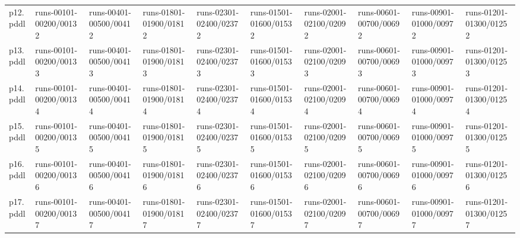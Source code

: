 \documentclass{article}
\begin{document}
\begin{tabular}{@{}lrrrrrrrrr@{}}
p12.pddl & \multicolumn{1}{|l|}{runs-00101-00200/00132} & \multicolumn{1}{|l|}{runs-00401-00500/00412} & \multicolumn{1}{|l|}{runs-01801-01900/01812} & \multicolumn{1}{|l|}{runs-02301-02400/02372} & \multicolumn{1}{|l|}{runs-01501-01600/01532} & \multicolumn{1}{|l|}{runs-02001-02100/02092} & \multicolumn{1}{|l|}{runs-00601-00700/00692} & \multicolumn{1}{|l|}{runs-00901-01000/00972} & \multicolumn{1}{|l|}{runs-01201-01300/01252} \\
p13.pddl & \multicolumn{1}{|l|}{runs-00101-00200/00133} & \multicolumn{1}{|l|}{runs-00401-00500/00413} & \multicolumn{1}{|l|}{runs-01801-01900/01813} & \multicolumn{1}{|l|}{runs-02301-02400/02373} & \multicolumn{1}{|l|}{runs-01501-01600/01533} & \multicolumn{1}{|l|}{runs-02001-02100/02093} & \multicolumn{1}{|l|}{runs-00601-00700/00693} & \multicolumn{1}{|l|}{runs-00901-01000/00973} & \multicolumn{1}{|l|}{runs-01201-01300/01253} \\
p14.pddl & \multicolumn{1}{|l|}{runs-00101-00200/00134} & \multicolumn{1}{|l|}{runs-00401-00500/00414} & \multicolumn{1}{|l|}{runs-01801-01900/01814} & \multicolumn{1}{|l|}{runs-02301-02400/02374} & \multicolumn{1}{|l|}{runs-01501-01600/01534} & \multicolumn{1}{|l|}{runs-02001-02100/02094} & \multicolumn{1}{|l|}{runs-00601-00700/00694} & \multicolumn{1}{|l|}{runs-00901-01000/00974} & \multicolumn{1}{|l|}{runs-01201-01300/01254} \\
p15.pddl & \multicolumn{1}{|l|}{runs-00101-00200/00135} & \multicolumn{1}{|l|}{runs-00401-00500/00415} & \multicolumn{1}{|l|}{runs-01801-01900/01815} & \multicolumn{1}{|l|}{runs-02301-02400/02375} & \multicolumn{1}{|l|}{runs-01501-01600/01535} & \multicolumn{1}{|l|}{runs-02001-02100/02095} & \multicolumn{1}{|l|}{runs-00601-00700/00695} & \multicolumn{1}{|l|}{runs-00901-01000/00975} & \multicolumn{1}{|l|}{runs-01201-01300/01255} \\
p16.pddl & \multicolumn{1}{|l|}{runs-00101-00200/00136} & \multicolumn{1}{|l|}{runs-00401-00500/00416} & \multicolumn{1}{|l|}{runs-01801-01900/01816} & \multicolumn{1}{|l|}{runs-02301-02400/02376} & \multicolumn{1}{|l|}{runs-01501-01600/01536} & \multicolumn{1}{|l|}{runs-02001-02100/02096} & \multicolumn{1}{|l|}{runs-00601-00700/00696} & \multicolumn{1}{|l|}{runs-00901-01000/00976} & \multicolumn{1}{|l|}{runs-01201-01300/01256} \\
p17.pddl & \multicolumn{1}{|l|}{runs-00101-00200/00137} & \multicolumn{1}{|l|}{runs-00401-00500/00417} & \multicolumn{1}{|l|}{runs-01801-01900/01817} & \multicolumn{1}{|l|}{runs-02301-02400/02377} & \multicolumn{1}{|l|}{runs-01501-01600/01537} & \multicolumn{1}{|l|}{runs-02001-02100/02097} & \multicolumn{1}{|l|}{runs-00601-00700/00697} & \multicolumn{1}{|l|}{runs-00901-01000/00977} & \multicolumn{1}{|l|}{runs-01201-01300/01257} \\

\end{tabular}
\end{document}
